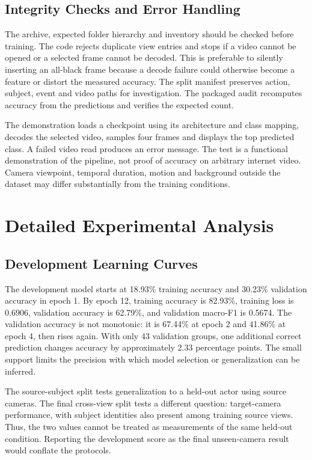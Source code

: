 \documentclass[runningheads]{llncs}
\begin{document}
\subsection{Integrity Checks and Error Handling}
The archive, expected folder hierarchy and inventory should be checked before training. The code rejects duplicate view entries and stops if a video cannot be opened or a selected frame cannot be decoded. This is preferable to silently inserting an all-black frame because a decode failure could otherwise become a feature or distort the measured accuracy. The split manifest preserves action, subject, event and video paths for investigation. The packaged audit recomputes accuracy from the predictions and verifies the expected count.

The demonstration loads a checkpoint using its architecture and class mapping, decodes the selected video, samples four frames and displays the top predicted class. A failed video read produces an error message. The test is a functional demonstration of the pipeline, not proof of accuracy on arbitrary internet video. Camera viewpoint, temporal duration, motion and background outside the dataset may differ substantially from the training conditions.

\section{Detailed Experimental Analysis}
\subsection{Development Learning Curves}
The development model starts at 18.93\% training accuracy and 30.23\% validation accuracy in epoch 1. By epoch 12, training accuracy is 82.93\%, training loss is 0.6906, validation accuracy is 62.79\%, and validation macro-F1 is 0.5674. The validation accuracy is not monotonic: it is 67.44\% at epoch 2 and 41.86\% at epoch 4, then rises again. With only 43 validation groups, one additional correct prediction changes accuracy by approximately 2.33 percentage points. The small support limits the precision with which model selection or generalization can be inferred.

The source-subject split tests generalization to a held-out actor using source cameras. The final cross-view split tests a different question: target-camera performance, with subject identities also present among training source views. Thus, the two values cannot be treated as measurements of the same held-out condition. Reporting the development score as the final unseen-camera result would conflate the protocols.
\end{document}
